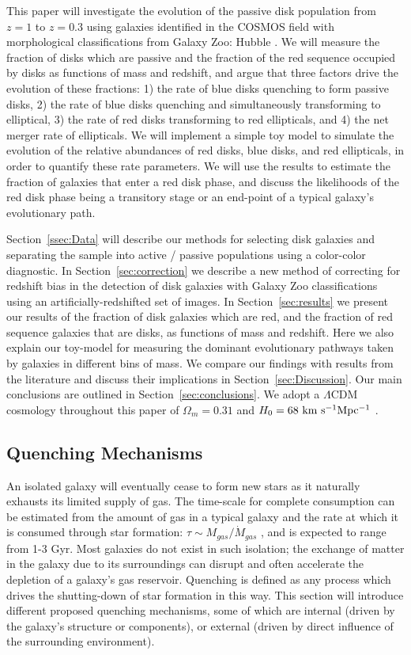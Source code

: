 This paper will investigate the evolution of the passive disk population from $z=1$ to $z=0.3$ using galaxies identified in the COSMOS field with morphological classifications from Galaxy Zoo: Hubble \citep{Willett2016}. We will measure the fraction of disks which are passive and the fraction of the red sequence occupied by disks as functions of mass and redshift, and argue that three factors drive the evolution of these fractions: 1) the rate of blue disks quenching to form passive disks, 2) the rate of blue disks quenching and simultaneously transforming to elliptical, 3) the rate of red disks transforming to red ellipticals, and 4) the net merger rate of ellipticals. We will implement a simple toy model to simulate the evolution of the relative abundances of red disks, blue disks, and red ellipticals, in order to quantify these rate parameters. We will use the results to estimate the fraction of galaxies that enter a red disk phase, and discuss the likelihoods of the red disk phase being a transitory stage or an end-point of a typical galaxy's evolutionary path.

Section~\ref{ssec:Data} will describe our methods for selecting disk galaxies and separating the sample into active / passive populations using a color-color diagnostic. In Section~\ref{sec:correction} we describe a new method of correcting for redshift bias in the detection of disk galaxies with Galaxy Zoo classifications using an artificially-redshifted set of images. In Section~\ref{sec:results} we present our results of the fraction of disk galaxies which are red, and the fraction of red sequence galaxies that are disks, as functions of mass and redshift. Here we also explain our toy-model for measuring the dominant evolutionary pathways taken by galaxies in different bins of mass. We compare our findings with results from the literature and discuss their implications in Section~\ref{sec:Discussion}. Our main conclusions are outlined in Section~\ref{sec:conclusions}. We adopt a $\Lambda$CDM cosmology throughout this paper of $\Omega_m=0.31$ and $H_0=68~\rm km~s^{-1} Mpc^{-1}$ \citep{PlanckCollaboration2015}.


\subsection{Quenching Mechanisms}
\label{ssec:qmechs}
An isolated galaxy will eventually cease to form new stars as it naturally exhausts its limited supply of gas. The time-scale for complete consumption can be estimated from the amount of gas in a typical galaxy and the rate at which it is consumed through star formation: $\tau \sim M_{gas}/\dot{M}_{gas}$ \citep{Larson1980}, and is expected to range from 1-3 Gyr. Most galaxies do not exist in such isolation; the exchange of matter in the galaxy due to its surroundings can disrupt and often accelerate the depletion of a galaxy's gas reservoir. Quenching is defined as any process which drives the shutting-down of star formation in this way. This section will introduce different proposed quenching mechanisms, some of which are internal (driven by the galaxy's structure or components), or external (driven by direct influence of the surrounding environment). 

